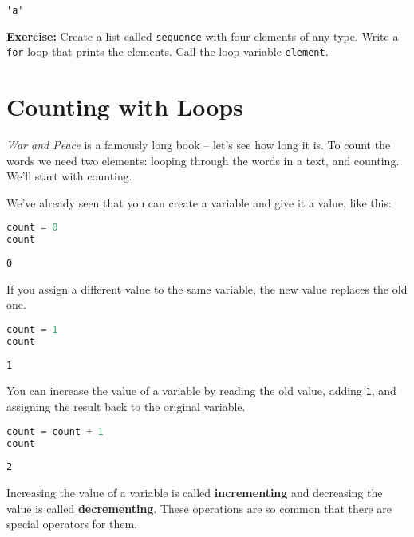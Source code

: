 \begin{lstlisting}[style=output]
'a'
\end{lstlisting}

\textbf{Exercise:} Create a list called
\passthrough{\lstinline!sequence!} with four elements of any type. Write
a \passthrough{\lstinline!for!} loop that prints the elements. Call the
loop variable \passthrough{\lstinline!element!}.

\hypertarget{counting-with-loops}{%
\section{Counting with Loops}\label{counting-with-loops}}

\emph{War and Peace} is a famously long book -- let's see how long it
is. To count the words we need two elements: looping through the words
in a text, and counting. We'll start with counting.

We've already seen that you can create a variable and give it a value,
like this:

\begin{lstlisting}[language=Python,style=source]
count = 0
count
\end{lstlisting}

\begin{lstlisting}[style=output]
0
\end{lstlisting}

If you assign a different value to the same variable, the new value
replaces the old one.

\begin{lstlisting}[language=Python,style=source]
count = 1
count
\end{lstlisting}

\begin{lstlisting}[style=output]
1
\end{lstlisting}

You can increase the value of a variable by reading the old value,
adding \passthrough{\lstinline!1!}, and assigning the result back to the
original variable.

\begin{lstlisting}[language=Python,style=source]
count = count + 1
count
\end{lstlisting}

\begin{lstlisting}[style=output]
2
\end{lstlisting}

Increasing the value of a variable is called \textbf{incrementing} and
decreasing the value is called \textbf{decrementing}. These operations
are so common that there are special operators for them.

